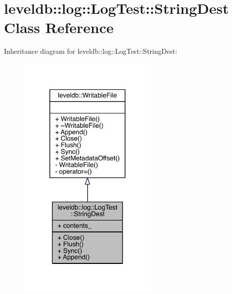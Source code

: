 \hypertarget{classleveldb_1_1log_1_1_log_test_1_1_string_dest}{}\section{leveldb\+:\+:log\+:\+:Log\+Test\+:\+:String\+Dest Class Reference}
\label{classleveldb_1_1log_1_1_log_test_1_1_string_dest}


Inheritance diagram for leveldb\+:\+:log\+:\+:Log\+Test\+:\+:String\+Dest\+:\nopagebreak
\begin{figure}[H]
\begin{center}
\leavevmode
\includegraphics[width=194pt]{classleveldb_1_1log_1_1_log_test_1_1_string_dest__inherit__graph}
\end{center}
\end{figure}


